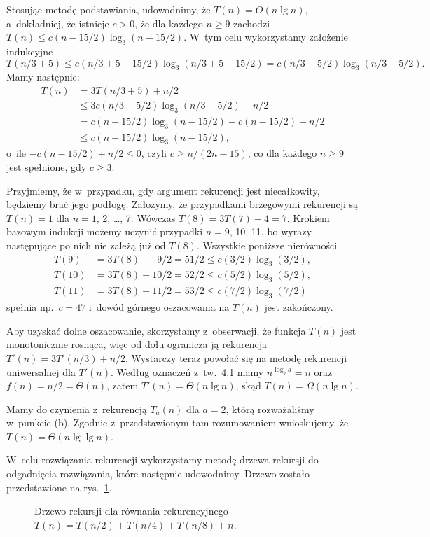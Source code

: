 \subproblem %
Stosując metodę podstawiania, udowodnimy, że $T(n)=O(n\lg n)$, a~dokładniej, że istnieje $c>0$, że dla każdego $n\ge9$ zachodzi $T(n)\le c(n-15/2)\log_3(n-15/2)$.
W~tym celu wykorzystamy założenie indukcyjne
\[
	T(n/3+5) \le c(n/3+5-15/2)\log_3(n/3+5-15/2) = c(n/3-5/2)\log_3(n/3-5/2).
\]
Mamy następnie:
\begin{align*}
	T(n) &= 3T(n/3+5)+n/2 \\
	&\le 3c(n/3-5/2)\log_3(n/3-5/2)+n/2 \\
	&= c(n-15/2)\log_3(n-15/2)-c(n-15/2)+n/2 \\
	&\le c(n-15/2)\log_3(n-15/2),
\end{align*}
o~ile $-c(n-15/2)+n/2\le0$, czyli $c\ge n/(2n-15)$, co dla każdego $n\ge9$ jest spełnione, gdy $c\ge3$.

Przyjmiemy, że w~przypadku, gdy argument rekurencji jest niecałkowity, będziemy brać jego podłogę.
Założymy, że przypadkami brzegowymi rekurencji są $T(n)=1$ dla $n=1$, 2, \dots, 7.
Wówczas $T(8)=3T(7)+4=7$.
Krokiem bazowym indukcji możemy uczynić przypadki $n=9$, 10, 11, bo wyrazy następujące po nich nie zależą już od $T(8)$.
Wszystkie poniższe nierówności
\begin{align*}
	T(9) &= 3T(8)+\phantom{1}9/2 = 51/2 \le c(3/2)\log_3(3/2), \\
	T(10) &= 3T(8)+10/2 = 52/2 \le c(5/2)\log_3(5/2), \\
	T(11) &= 3T(8)+11/2 = 53/2 \le c(7/2)\log_3(7/2)
\end{align*}
spełnia np.\ $c=47$ i~dowód górnego oszacowania na $T(n)$ jest zakończony.

Aby uzyskać dolne oszacowanie, skorzystamy z~obserwacji, że funkcja $T(n)$ jest monotonicznie rosnąca, więc od dołu ogranicza ją rekurencja $T'(n)=3T'(n/3)+n/2$.
Wystarczy teraz powołać się na metodę rekurencji uniwersalnej dla $T'(n)$.
Według oznaczeń z~tw.\ 4.1 mamy $n^{\log_ba}=n$ oraz $f(n)=n/2=\Theta(n)$, zatem $T'(n)=\Theta(n\lg n)$, skąd $T(n)=\Omega(n\lg n)$.

\subproblem %
Mamy do czynienia z~rekurencją $T_a(n)$ dla $a=2$, którą rozważaliśmy w~punkcie (b).
Zgodnie z~przedstawionym tam rozumowaniem wnioskujemy, że $T(n)=\Theta(n\lg\lg n)$.

\subproblem %
W~celu rozwiązania rekurencji wykorzystamy metodę drzewa rekursji do odgadnięcia rozwiązania, które następnie udowodnimy.
Drzewo zostało przedstawione na rys.\ \ref{fig:4-4f}.
\begin{figure}[!ht]
	\centering 
	\caption{Drzewo rekursji dla równania rekurencyjnego $T(n)=T(n/2)+T(n/4)+T(n/8)+n$.} \label{fig:4-4f}
\end{figure}

